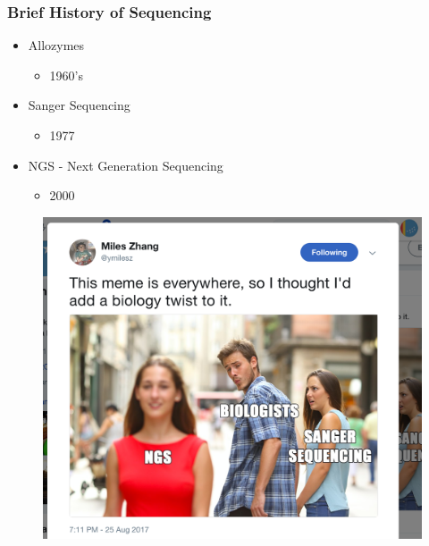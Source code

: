 \documentclass[14pt]{beamer}
\begin{document}
\begin{frame}
\frametitle{Brief History of Sequencing}
\begin{itemize}
	\item Allozymes
	\begin{itemize}
		\item 1960's
	\end{itemize}
	\item Sanger Sequencing
	\begin{itemize}
		\item 1977
	\end{itemize}
	\item NGS - Next Generation Sequencing
	\begin{itemize}
		\item 2000
	\end{itemize}
\end{itemize}
\end{frame}

\begin{frame}
\begin{figure}
\includegraphics[width=0.8\linewidth]{images_20170829_NGS_meme.png}
\end{figure}
\end{frame}
\end{document}
